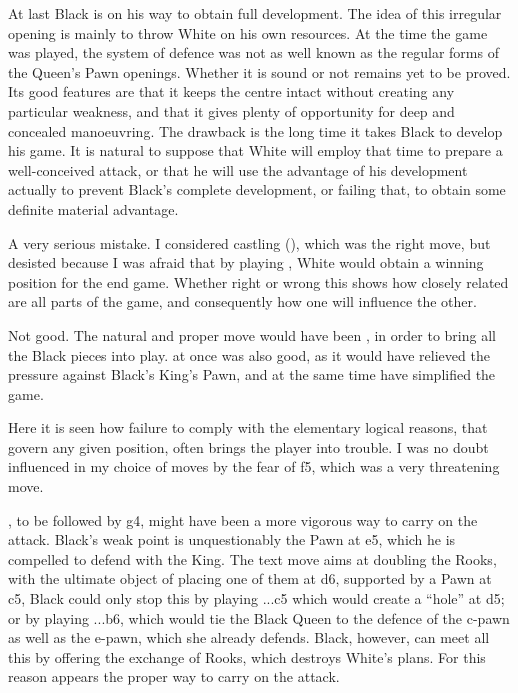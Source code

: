 \documentclass[10pt,twoside]{article}
\begin{document}
At last Black is on his way to obtain full development. The idea of this irregular opening is mainly to throw White on his own resources. At the time the game was played, the system of defence was not as well known as the regular forms of the Queen's Pawn openings. Whether it is sound or not remains yet to be proved. Its good features are that it keeps the centre intact without creating any particular weakness, and that it gives plenty of opportunity for deep and concealed manoeuvring. The drawback is the long time it takes Black to develop his game. It is natural to suppose that White will employ that time to prepare a well-conceived attack, or that he will use the advantage of his development actually to prevent Black's complete development, or failing that, to obtain some definite material advantage.


\board


A very serious mistake. I considered castling (), which was the right move, but desisted because I was afraid that by playing , White would obtain a winning position for the end game. Whether right or wrong this shows how closely related are all parts of the game, and consequently how one will influence the other.


Not good. The natural and proper move would have been , in order to bring all the Black pieces into play.  at once was also good, as it would have relieved the pressure against Black's King's Pawn, and at the same time have simplified the game.

Here it is seen how failure to comply with the elementary logical reasons, that govern any given position, often brings the player into trouble. I was no doubt influenced in my choice of moves by the fear of \figB f5, which was a very threatening move.


\board


, to be followed by g4, might have been a more vigorous way to carry on the attack. Black's weak point is unquestionably the Pawn at e5, which he is compelled to defend with the King. The text move aims at doubling the Rooks, with the ultimate object of placing one of them at d6, supported by a Pawn at c5, Black could only stop this by playing ...c5 which would create a ``hole'' at d5; or by playing ...b6, which would tie the Black Queen to the defence of the c-pawn as well as the e-pawn, which she already defends. Black, however, can meet all this by offering the exchange of Rooks, which destroys White's plans. For this reason  appears the proper way to carry on the attack.
\end{document}
